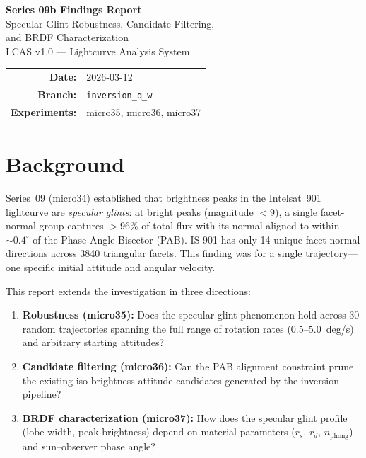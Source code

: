\documentclass[11pt,a4paper]{article}
\begin{document}
\begin{center}
{\LARGE\bfseries Series 09b Findings Report}\\[0.4em]
{\Large Specular Glint Robustness, Candidate Filtering,\\and BRDF Characterization}\\[1.2em]
{\large LCAS v1.0 --- Lightcurve Analysis System}\\[0.8em]
\begin{tabular}{rl}
\textbf{Date:} & 2026-03-12 \\
\textbf{Branch:} & \texttt{inversion\_q\_w} \\
\textbf{Experiments:} & micro35, micro36, micro37 \\
\end{tabular}
\end{center}
\vspace{1em}

\section{Background}

Series~09 (micro34) established that brightness peaks in the Intelsat~901 lightcurve are \emph{specular glints}: at bright peaks (magnitude $<9$), a single facet-normal group captures $>96\%$ of total flux with its normal aligned to within ${\sim}0.4^\circ$ of the Phase Angle Bisector (PAB). IS-901 has only 14 unique facet-normal directions across 3840 triangular facets. This finding was for a single trajectory---one specific initial attitude and angular velocity.

This report extends the investigation in three directions:

\begin{enumerate}[leftmargin=2em]
  \item \textbf{Robustness (micro35):} Does the specular glint phenomenon hold across 30 random trajectories spanning the full range of rotation rates ($0.5$--$5.0$~deg/s) and arbitrary starting attitudes?
  \item \textbf{Candidate filtering (micro36):} Can the PAB alignment constraint prune the existing iso-brightness attitude candidates generated by the inversion pipeline?
  \item \textbf{BRDF characterization (micro37):} How does the specular glint profile (lobe width, peak brightness) depend on material parameters ($r_s$, $r_d$, $n_{\mathrm{phong}}$) and sun--observer phase angle?
\end{enumerate}
\end{document}
